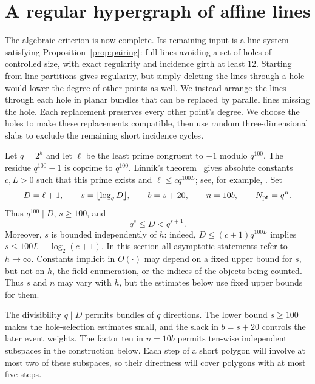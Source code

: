 \section{A regular hypergraph of affine lines}\label{sec:hypergraph}

The algebraic criterion is now complete. Its remaining input is a line
system satisfying Proposition~\ref{prop:pairing}: full lines avoiding a
set of holes of controlled size, with exact regularity and incidence
girth at least $12$.
Starting from line partitions gives regularity, but simply deleting the
lines through a hole would lower the degree of other points as well.
We instead arrange the lines through each hole in planar bundles that
can be replaced by parallel lines missing the hole. Each replacement
preserves every other point's degree. We choose the holes to make these
replacements compatible, then use random three-dimensional slabs to
exclude the remaining short incidence cycles.

Let $q=2^h$ and let $\ell$ be the least prime congruent to $-1$ modulo
$q^{100}$. The residue $q^{100}-1$ is coprime to $q^{100}$. Linnik's theorem~\cite{Linnik1944} gives absolute constants $c,L>0$ such that
this prime exists and $\ell\le c q^{100L}$; see, for example,
\cite[Theorem~1.1]{Xylouris2011}.  Set
\begin{equation}\label{eq:hypergraph-parameters}
 D=\ell+1,\qquad s=\lfloor\log_qD\rfloor,\qquad
 b=s+20,\qquad n=10b,\qquad N_{\rm pt}=q^n.
\end{equation}
Thus $q^{100}\mid D$, $s\ge100$, and
\begin{equation}\label{eq:hypergraph-growth}
 q^s\le D<q^{s+1}.
\end{equation}
Moreover, $s$ is bounded independently of $h$: indeed,
$D\le(c+1)q^{100L}$ implies
$s\le100L+\log_2(c+1)$.  In this section all asymptotic statements refer
to $h\to\infty$.  Constants implicit in $O(\cdot)$ may depend on a
fixed upper bound for $s$, but not on $h$, the field enumeration,
or the indices of the objects being counted. Thus $s$ and $n$ may vary
with $h$, but the estimates below use fixed upper bounds for them.

The divisibility $q\mid D$ permits bundles of $q$ directions. The lower
bound $s\ge100$ makes the hole-selection estimates small, and the slack
in $b=s+20$ controls the later event weights. The factor ten in $n=10b$
permits ten-wise independent subspaces in the construction below. Each
step of a short polygon will involve at most two of these subspaces,
so their directness will cover polygons with at most five steps.

